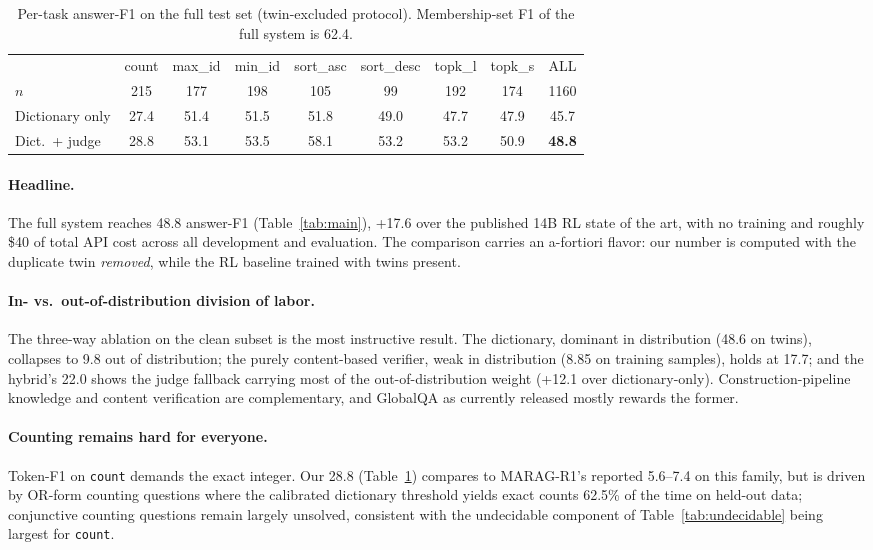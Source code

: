 \documentclass[11pt]{article}
\begin{document}
\begin{table}[h]
\centering
\begin{tabular}{lccccccc|c}
\toprule
 & count & max\_id & min\_id & sort\_asc & sort\_desc & topk\_l & topk\_s & ALL\\
$n$ & 215 & 177 & 198 & 105 & 99 & 192 & 174 & 1160\\
\midrule
Dictionary only & 27.4 & 51.4 & 51.5 & 51.8 & 49.0 & 47.7 & 47.9 & 45.7\\
Dict.\ + judge & 28.8 & 53.1 & 53.5 & 58.1 & 53.2 & 53.2 & 50.9 & \textbf{48.8}\\
\bottomrule
\end{tabular}
\caption{Per-task answer-F1 on the full test set (twin-excluded protocol). Membership-set F1 of the full system is 62.4.}
\label{tab:pertask}
\end{table}

\paragraph{Headline.} The full system reaches 48.8 answer-F1 (Table~\ref{tab:main}), +17.6 over the published 14B RL state of the art, with no training and roughly \$40 of total API cost across all development and evaluation. The comparison carries an a-fortiori flavor: our number is computed with the duplicate twin \emph{removed}, while the RL baseline trained with twins present.

\paragraph{In- vs.\ out-of-distribution division of labor.} The three-way ablation on the clean subset is the most instructive result. The dictionary, dominant in distribution (48.6 on twins), collapses to 9.8 out of distribution; the purely content-based verifier, weak in distribution (8.85 on training samples), holds at 17.7; and the hybrid's 22.0 shows the judge fallback carrying most of the out-of-distribution weight (+12.1 over dictionary-only). Construction-pipeline knowledge and content verification are complementary, and GlobalQA as currently released mostly rewards the former.

\paragraph{Counting remains hard for everyone.} Token-F1 on \texttt{count} demands the exact integer. Our 28.8 (Table~\ref{tab:pertask}) compares to MARAG-R1's reported 5.6--7.4 on this family, but is driven by OR-form counting questions where the calibrated dictionary threshold yields exact counts 62.5\% of the time on held-out data; conjunctive counting questions remain largely unsolved, consistent with the undecidable component of Table~\ref{tab:undecidable} being largest for \texttt{count}.
\end{document}
